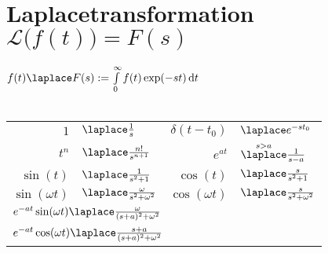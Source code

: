 \documentclass[german]{latex4ei/latex4ei_sheet}
\renewcommand{\diff}{\mathop{}\!\mathrm{\vphantom( d}}
\begin{document}
\section{Laplacetransformation \quad $\mathcal L\bigl(f(t)\bigr) = F(s)$}
\begin{sectionbox}
	$f(t) \laplace F(s) := \int\limits_0^\infty f(t) \exp(-st) \diff t$\\
	\\
	\everymath{\displaystyle}	%
	\begin{tabular}{rl|rl}
		$1$ & \!\!\!\!\!\!\!\!\!\!$\laplace \frac{1}{s}$ & $\delta(t-t_0)$ & \!\!\!\!\!\!\!\!\!\!$\laplace e^{-s t_0}$\\[0.2em]
		$t^n$ & \!\!\!\!\!\!\!\!\!\!$\laplace \frac{n!}{s^{n+1}}$ & $e^{at}$  & \!\!\!\!\!\!\!\!\!\!$\overset{s > a}{ \laplace } \frac{1}{s-a}$\\[0.5em] 
		$\sin(t)$ & \!\!\!\!\!\!\!\!\!\!$\laplace \frac{1}{s^2 + 1}$ & $\cos(t)$ & \!\!\!\!\!\!\!\!\!\!$\laplace \frac{s}{s^2 + 1}$\\[0.5em]
		$\sin(\omega t)$ & \!\!\!\!\!\!\!\!\!\!$\laplace \frac{\omega}{s^2 + \omega^2}$ & $\cos(\omega t)$ & \!\!\!\!\!\!\!\!\!\!$\laplace \frac{s}{s^2 + \omega^2}$\\[0.5em]
		\multicolumn{4}{l}{ $e^{-at} \sin(\omega t) \laplace \frac{\omega}{(s+a)^2+\omega^2}$} \\
		\multicolumn{4}{l}{ $e^{-at} \cos(\omega t) \laplace \frac{s+a}{(s+a)^2+\omega^2}$}\\ 		


\end{tabular}
\end{sectionbox}
\end{document}
